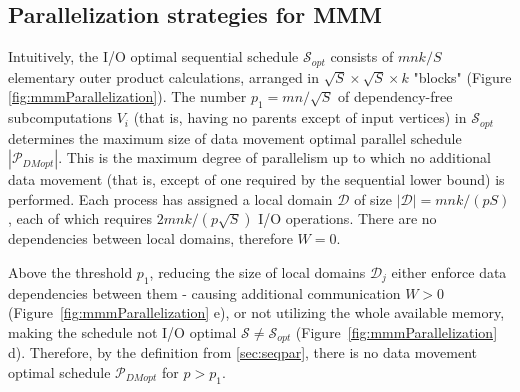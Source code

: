 \documentclass[sigplan,review,anonymous]{acmart}\settopmatter{printfolios=true,printccs=false,printacmref=false}
\begin{document}
\subsection{Parallelization strategies for MMM}
 Intuitively, the 
I/O optimal sequential schedule $\mathcal{S}_{opt}$
consists of $mnk/S$ elementary outer product calculations, arranged in
$\sqrt{S} \times \sqrt{S} \times k$ "blocks" (Figure
\ref{fig:mmmParallelization}). The number $p_1 = mn/\sqrt{S}$ of 
dependency-free subcomputations 
$V_i$
(that is, having no parents except of input vertices) in $\mathcal{S}_{opt}$ 
determines the maximum size of data movement optimal parallel schedule 
$|\mathcal{P}_{DMopt}|$. This is the maximum 
degree of parallelism up to which no
additional data movement (that is, except of one required by the sequential 
lower bound) is performed. Each process has assigned a local domain 
$\mathcal{D}$ of size 
$|\mathcal{D}| = mnk/(pS)$, each of which requires $2mnk/(p\sqrt{S})$ I/O 
operations. 
There are 
no dependencies between local domains, therefore $W = 0$.

Above the  
threshold $p_1$, reducing the size of 
local domains $\mathcal{D}_j$ either enforce data dependencies between them - 
causing
additional communication $W > 0$ (Figure~\ref{fig:mmmParallelization} 
e), or not 
utilizing the whole available memory, making the schedule not I/O optimal 
$\mathcal{S} \ne \mathcal{S}_{opt}$ 
(Figure~\ref{fig:mmmParallelization} d). Therefore, by the definition from  
\cref{sec:seqpar}, there is no data movement optimal schedule 
$\mathcal{P}_{DMopt}$ for $p > p_1$.
\end{document}
